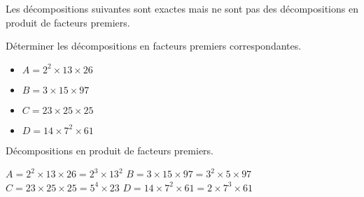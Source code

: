 \begin{exercice*}
    Les décompositions suivantes sont exactes mais ne sont pas des décompositions en produit de facteurs
    premiers.

    Déterminer les décompositions en facteurs premiers correspondantes.    
    \begin{itemize}
        \item[] $A=2^2\times 13\times 26$
        \item[] $B=3\times 15\times 97$
        \item[] $C=23\times 25\times 25$
        \item[] $D=14\times 7^2\times 61$
    \end{itemize}
\end{exercice*}
\begin{corrige}
    Décompositions en produit de facteurs premiers.
    
    \begin{itemize}
        \def\item{}
        \item $A=2^2\times 13\times 26=2^3\times 13^2$
        \item $B=3\times 15\times 97=3^2\times 5\times 97$
        \item $C=23\times 25\times 25=5^4\times 23$
        \item $D=14\times 7^2\times 61=2\times 7^3\times 61$
    \end{itemize}
\end{corrige}

